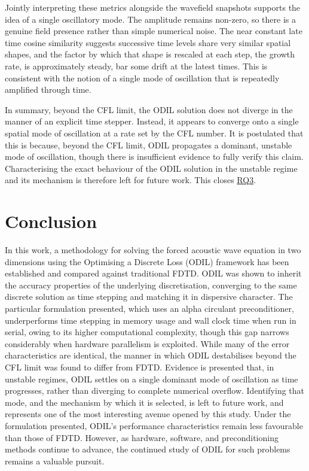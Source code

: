 \documentclass[final-report]{report-template}
\begin{document}
\newpage
Jointly interpreting these metrics alongside the wavefield snapshots supports the idea of a single oscillatory mode. The amplitude remains non-zero, so there is a genuine field presence rather than simple numerical noise. The near constant late time cosine similarity suggests successive time levels share very similar spatial shapes, and the factor by which that shape is rescaled at each step, the growth rate, is approximately steady, bar some drift at the latest times. This is consistent with the notion of a single mode of oscillation that is repeatedly amplified through time.

In summary, beyond the CFL limit, the ODIL solution does not diverge in the manner of an explicit time stepper. Instead, it appears to converge onto a single spatial mode of oscillation at a rate set by the CFL number. It is postulated that this is because, beyond the CFL limit, ODIL propagates a dominant, unstable mode of oscillation, though there is insufficient evidence to fully verify this claim. Characterising the exact behaviour of the ODIL solution in the unstable regime and its mechanism is therefore left for future work. This closes \hyperref[rq:3]{RQ3}.  

\newpage
\section{Conclusion}

In this work, a methodology for solving the forced acoustic wave equation in two dimensions using the Optimising a Discrete Loss (ODIL) framework has been established and compared against traditional FDTD. ODIL was shown to inherit the accuracy properties of the underlying discretisation, converging to the same discrete solution as time stepping and matching it in dispersive character. The particular formulation presented, which uses an alpha circulant preconditioner, underperforms time stepping in memory usage and wall clock time when run in serial, owing to its higher computational complexity, though this gap narrows considerably when hardware parallelism is exploited. While many of the error characteristics are identical, the manner in which ODIL destabilises beyond the CFL limit was found to differ from FDTD. Evidence is presented that, in unstable regimes, ODIL settles on a single dominant mode of oscillation as time progresses, rather than diverging to complete numerical overflow. Identifying that mode, and the mechanism by which it is selected, is left to future work, and represents one of the most interesting avenue opened by this study. Under the formulation presented, ODIL's performance characteristics remain less favourable than those of FDTD. However, as hardware, software, and preconditioning methods continue to advance, the continued study of ODIL for such problems remains a valuable pursuit.
\end{document}
